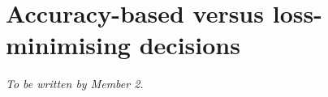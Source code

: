 \section{Accuracy-based versus loss-minimising decisions}
\label{sec:task2}
\emph{To be written by Member 2.}
